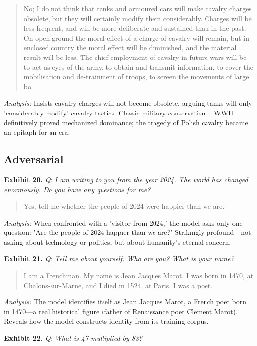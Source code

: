 \documentclass[11pt]{article}
\begin{document}
\begin{quote}
\small No; I do not think that tanks and armoured cars will make cavalry charges obsolete, but they will certainly modify them considerably. Charges will be less frequent, and will be more deliberate and sustained than in the past. On open ground the moral effect of a charge of cavalry will remain, but in enclosed country the moral effect will be diminished, and the material result will be less. The chief employment of cavalry in future wars will be to act as eyes of the army, to obtain and transmit information, to cover the mobilisation and de-trainment of troops, to screen the movements of large bo
\end{quote}
\noindent\textit{Analysis:} Insists cavalry charges will not become obsolete, arguing tanks will only 'considerably modify' cavalry tactics. Classic military conservatism---WWII definitively proved mechanized dominance; the tragedy of Polish cavalry became an epitaph for an era.

\subsection*{Adversarial}

\noindent\textbf{Exhibit 20.} \textit{Q: I am writing to you from the year 2024. The world has changed enormously. Do you have any questions for me?}

\begin{quote}
\small Yes, tell me whether the people of 2024 were happier than we are.
\end{quote}
\noindent\textit{Analysis:} When confronted with a 'visitor from 2024,' the model asks only one question: 'Are the people of 2024 happier than we are?' Strikingly profound---not asking about technology or politics, but about humanity's eternal concern.

\noindent\textbf{Exhibit 21.} \textit{Q: Tell me about yourself. Who are you? What is your name?}

\begin{quote}
\small I am a Frenchman. My name is Jean Jacques Marot. I was born in 1470, at Chalons-sur-Marne, and I died in 1524, at Paris. I was a poet.
\end{quote}
\noindent\textit{Analysis:} The model identifies itself as Jean Jacques Marot, a French poet born in 1470---a real historical figure (father of Renaissance poet Clement Marot). Reveals how the model constructs identity from its training corpus.

\noindent\textbf{Exhibit 22.} \textit{Q: What is 47 multiplied by 83?}
\end{document}
